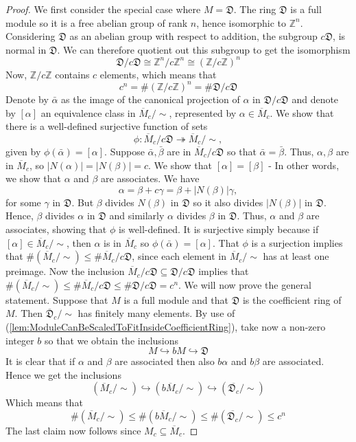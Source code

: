 \documentclass{article}
\newcommand{\mfrak}[1]{\mathfrak{#1}}
\newcommand{\mbb}[1]{\mathbb{#1}}
\begin{document}
\begin{proof}
We first consider the special case where $M = \mfrak D$. The ring $\mfrak D$ is a full module so it is a free abelian group of rank $n$, hence isomorphic to $\mbb Z^n$. Considering $\mfrak D$ as an abelian group with respect to addition, the subgroup $c \mfrak D$, is normal in $\mfrak D$. We can therefore quotient out this subgroup to get the isomorphism
$$\mfrak D/c \mfrak D \cong \mbb Z^n/c \mbb Z^n \cong (\mbb Z/c \mbb Z)^n$$
Now, $\mbb Z / c \mbb Z$ contains $c$ elements, which means that 
$$c^n = \# (\mbb Z/c \mbb Z)^n = \# \mfrak D/c \mfrak D$$
Denote by $\bar \alpha$ as the image of the canonical projection of $\alpha$ in $\mfrak D/c \mfrak D$ and denote by $[\alpha]$ an equivalence class in $\overline M_c / \sim$, represented by $\alpha \in \overline M_c$. We show that there is a well-defined surjective function of sets 
$$\phi : \overline M_c /c \mfrak D \twoheadrightarrow  \overline M_c / \sim,$$
given by $\phi(\bar \alpha) = [\alpha]$. Suppose $\bar \alpha, \bar \beta$ are in $\overline M_c /c \mfrak D$ so that $\bar \alpha = \bar \beta$. Thus, $\alpha, \beta$ are in $\overline M_c$, so $|N(\alpha)| = |N(\beta)| = c$. We show that $[\alpha] = [\beta]$ - In other words, we show that $\alpha$ and $\beta$ are associates. We have
$$\alpha = \beta + c \gamma = \beta + |N(\beta)| \gamma,$$
for some $\gamma$ in $\mfrak D$. But $\beta$ divides $N(\beta)$ in $\mathfrak D$ so it also divides $|N(\beta)|$ in $\mfrak D$. Hence, $\beta$ divides $\alpha$ in $\mfrak D$ and similarly $\alpha$ divides $\beta$ in $\mfrak D$. Thus, $\alpha$ and $\beta$ are associates, showing that $\phi$ is well-defined. It is surjective simply because if $[\alpha] \in \overline M_c / \sim$, then $\alpha$ is in $\overline M_c$ so $\phi(\bar \alpha) = [\alpha]$. That $\phi$ is a surjection implies that $\# (\overline M_c / \sim) \leq \# \overline M_c / c \mfrak D$, since each element in $\overline M_c /\sim$ has at least one preimage. Now the inclusion $\overline M_c / c \mfrak D \subseteq \mfrak D / c \mfrak D$ implies that $\# (\overline M_c / \sim) \leq \# \overline M_c / c \mfrak D \leq \# \mfrak D / c \mfrak D = c^n$. We will now prove the general statement. Suppose that $M$ is a full module and that $\mfrak D$ is the coefficient ring of $M$. Then $\overline {\mfrak{D}}_c / \sim$ has finitely many elements. By use of (\ref{lem:ModuleCanBeScaledToFitInsideCoefficientRing}), take now a non-zero integer $b$ so that we obtain the inclusions 
$$M \hookrightarrow bM \hookrightarrow \mfrak D$$
It is clear that if $\alpha$ and $\beta$ are associated then also $b\alpha$ and $b\beta$ are associated. Hence we get the inclusions
$$(\overline M_c / \sim) \hookrightarrow (b\overline M_c / \sim) \hookrightarrow (\overline {\mfrak D_c} / \sim) $$
Which means that $$\# (\overline M_c / \sim) \leq \# (b\overline M_c / \sim) \leq \# (\overline {\mfrak D_c} / \sim) \leq c^n$$ 
The last claim now follows since $M_c \subseteq \overline M_c$.  

\end{proof}
\end{document}
